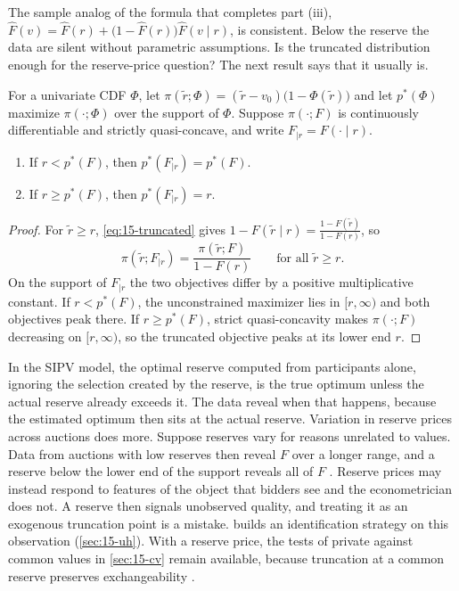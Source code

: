 The sample analog of the formula that completes part (iii), $\hat F(v)=\hat F(r)+\big(1-\hat F(r)\big)\hat F(v\mid r)$, is consistent. Below
the reserve the data are silent without parametric assumptions. Is the truncated distribution enough for the
reserve-price question? The next result says that it usually is.

\begin{proposition}\label{prop:15-trunc-reserve}
For a univariate CDF $\Phi$, let $\pi(\tilde r;\Phi)=(\tilde r-v_0)\big(1-\Phi(\tilde r)\big)$ and let $p^*(\Phi)$ maximize
$\pi(\cdot;\Phi)$ over the support of $\Phi$. Suppose $\pi(\cdot;F)$ is continuously differentiable and strictly
quasi-concave, and write $F_{\mid r}=F(\cdot\mid r)$.
\begin{enumerate}[label=(\roman*)]
\item If $r<p^*(F)$, then $p^*(F_{\mid r})=p^*(F)$.
\item If $r\ge p^*(F)$, then $p^*(F_{\mid r})=r$.
\end{enumerate}
\end{proposition}

\begin{proof}
For $\tilde r\ge r$, \eqref{eq:15-truncated} gives $1-F(\tilde r\mid r)=\frac{1-F(\tilde r)}{1-F(r)}$, so
\[
\pi(\tilde r;F_{\mid r})=\frac{\pi(\tilde r;F)}{1-F(r)}\qquad\text{for all }\tilde r\ge r .
\]
On the support of $F_{\mid r}$ the two objectives differ by a positive multiplicative constant. If $r<p^*(F)$, the
unconstrained maximizer lies in $[r,\infty)$ and both objectives peak there. If $r\ge p^*(F)$, strict
quasi-concavity makes $\pi(\cdot;F)$ decreasing on $[r,\infty)$, so the truncated objective peaks at its lower end
$r$.
\end{proof}

In the SIPV model, the optimal reserve computed from participants alone, ignoring the selection created by the
reserve, is the true optimum unless the actual reserve already exceeds it. The data reveal when that happens,
because the estimated optimum then sits at the actual reserve. Variation in reserve prices across auctions does more.
Suppose reserves vary for reasons unrelated to values. Data from auctions with low reserves then reveal $F$ over a
longer range, and a reserve below the lower end of the support reveals all of $F$
\citep[Section~6.3.1]{AtheyHaile2007}. Reserve prices may instead respond to features of the object that bidders see
and the econometrician does not. A reserve then signals unobserved quality, and treating it as an exogenous
truncation point is a mistake. \citet{Roberts2013} builds an identification
strategy on this observation (\cref{sec:15-uh}). With a reserve price, the tests of private against common values
in \cref{sec:15-cv} remain available, because truncation at a common reserve preserves exchangeability
\citep[Corollary~4]{AtheyHaile2002}.

